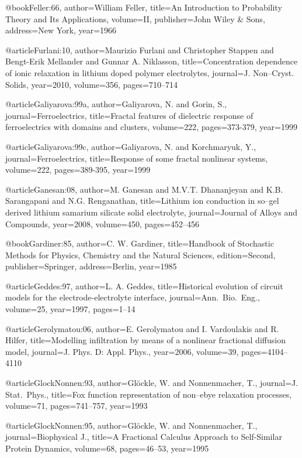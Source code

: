 \begin{thebibliography}{99}
@book{Feller:66,
  author={William Feller},
  title={An Introduction to Probability Theory and Its Applications},
  volume={II},
  publisher={John Wiley {\&} Sons},
  address={New York},
  year={1966}
}

@article{Furlani:10,
  author={Maurizio Furlani and Christopher Stappen and Bengt-Erik Mellander and
    Gunnar A. Niklasson},
  title={Concentration dependence of ionic relaxation in lithium doped polymer
    electrolytes},
  journal={J. Non--Cryst. Solids},
  year={2010},
  volume={356},
  pages={710--714}
}

@article{Galiyarova:99a,
  author={Galiyarova, N. and Gorin, S.},
  journal={Ferroelectrics},
  title={Fractal features of dielectric response of ferroelectrics with domains
    and clusters},
  volume={222},
  pages={373-379},
  year={1999}
}

@article{Galiyarova:99c,
  author={Galiyarova, N. and Korchmaryuk, Y.},
  journal={Ferroelectrics},
  title={Response of some fractal nonlinear systems},
  volume={222},
  pages={389-395},
  year={1999}
}

@article{Ganesan:08,
  author={M. Ganesan and M.V.T. Dhananjeyan and K.B. Sarangapani and N.G. Renganathan},
  title={Lithium ion conduction in so--gel derived lithium samarium silicate solid
    electrolyte},
  journal={Journal of Alloys and Compounds},
  year={2008},
  volume={450},
  pages={452--456}
}

@book{Gardiner:85,
  author={C. W. Gardiner},
  title={Handbook of Stochastic Methods for Physics, Chemistry and the Natural
    Sciences},
  edition={Second},
  publisher={Springer},
  address={Berlin},
  year={1985}
}

@article{Geddes:97,
  author={L. A. Geddes},
  title={Historical evolution of circuit models for the electrode-electrolyte interface},
  journal={Ann.\ Bio.\ Eng.},
  volume={25},
  year={1997},
  pages={1--14}
}

@article{Gerolymatou:06,
  author={E. Gerolymatou and I. Vardoulakis and R. Hilfer},
  title={Modelling infiltration by means of a nonlinear fractional diffusion model},
  journal={J. Phys. D: Appl. Phys.},
  year={2006},
  volume={39},
  pages={4104--4110}
}

@article{GlockNonnen:93,
  author={Gl{\"{o}}ckle, W. and Nonnenmacher, T.},
  journal={J. Stat.\ Phys.},
  title={Fox function representation of non--ebye relaxation processes},
  volume={71},
  pages={741--757},
  year={1993}
}

@article{GlockNonnen:95,
  author={Gl{\"{o}}ckle, W. and Nonnenmacher, T.},
  journal={Biophysical J.},
  title={A Fractional Calculus Approach to Self-Similar Protein Dynamics},
  volume={68},
  pages={46--53},
  year={1995}
}


\end{thebibliography}
